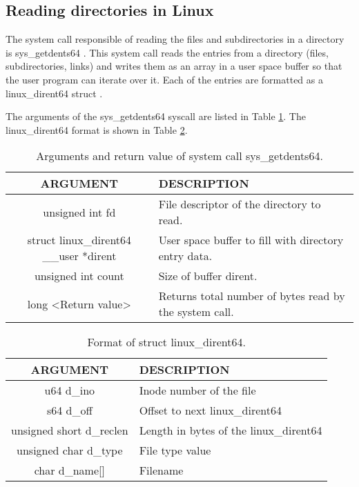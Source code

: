 \subsection{Reading directories in Linux}
The system call responsible of reading the files and subdirectories in a directory is sys\_getdents64 \cite{code_kernel_getdents64}. This system call reads the entries from a directory (files, subdirectories, links) and writes them as an array in a user space buffer so that the user program can iterate over it. Each of the entries are formatted as a linux\_dirent64 struct \cite{getdents_man} \cite{code_kernel_linux_dirent64}. 

The arguments of the sys\_getdents64 syscall are listed in Table \ref{table:getdents_args}. The linux\_dirent64 format is shown in Table \ref{table:linux_dirent64}.

\begin{table}[htbp]
\begin{tabular}{|c|>{\centering\arraybackslash}p{7cm}|}
\hline
\textbf{ARGUMENT} & \textbf{DESCRIPTION} \\
\hline
\hline
unsigned int fd & File descriptor of the directory to read.\\
\hline
struct linux\_dirent64 \_\_user *dirent & User space buffer to fill with directory entry data.\\
\hline
unsigned int count & Size of buffer dirent.\\
\hline
long <Return value> & Returns total number of bytes read by the system call.\\
\hline
\end{tabular}
\caption{Arguments and return value of system call sys\_getdents64.}
\label{table:getdents_args}
\end{table}

\begin{table}[htbp]
\begin{tabular}{|c|>{\centering\arraybackslash}p{7cm}|}
\hline
\textbf{ARGUMENT} & \textbf{DESCRIPTION} \\
\hline
\hline
u64 d\_ino & Inode number of the file\\
\hline
s64 d\_off & Offset to next linux\_dirent64\\
\hline
unsigned short d\_reclen & Length in bytes of the linux\_dirent64\\
\hline
unsigned char d\_type & File type value\\
\hline
char d\_name[] & Filename\\
\hline
\end{tabular}
\caption{Format of struct linux\_dirent64.}
\label{table:linux_dirent64}
\end{table}

